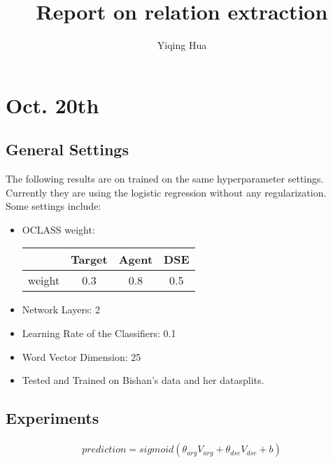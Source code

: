 \documentclass[a4paper, 12pt]{article}
\title{Report on relation extraction}
\author{Yiqing Hua}
\begin{document}
\maketitle

\section{Oct. 20th}

\subsection{General Settings}

The following results are on trained on the same hyperparameter
settings. Currently they are using the logistic regression without any
regularization. \\
Some settings include:\\
\begin{itemize}
  \item OCLASS weight: 
    \begin{table}[h!]
      \centering
      \begin{tabular}{c|c|c|c}
        & Target  & Agent & DSE \\
        \hline
       weight & 0.3  & 0.8 & 0.5
      \end{tabular}
    \end{table}
  \item Network Layers: 2
  \item Learning Rate of the Classifiers: 0.1
  \item Word Vector Dimension: 25
  \item Tested and Trained on Bishan's data and her datasplits.
\end{itemize}

\subsection{Experiments}

\begin{align*}
  prediction = sigmoid(\theta_{arg}V_{arg} + \theta_{dse}V_{dse} + b) 
\end{align*}
\end{document}
